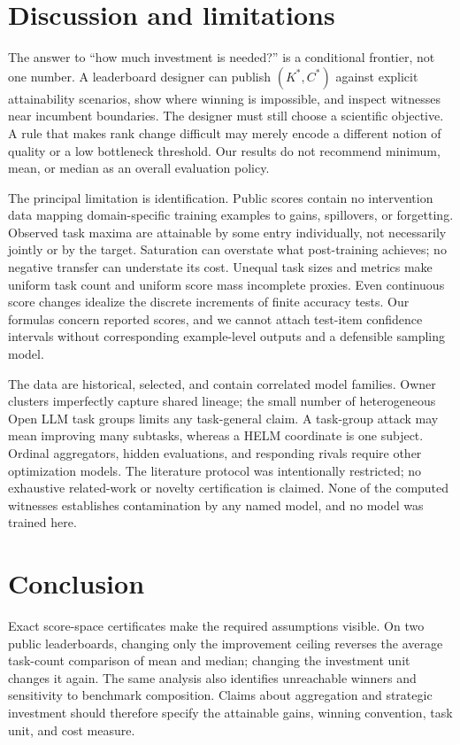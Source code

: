 \documentclass{article}
\begin{document}
\section{Discussion and limitations}
\label{sec:discussion}
The answer to ``how much investment is needed?'' is a conditional frontier, not
one number. A leaderboard designer can publish $(K^*,C^*)$ against explicit
attainability scenarios, show where winning is impossible, and inspect witnesses
near incumbent boundaries. The designer must still choose a scientific objective.
A rule that makes rank change difficult may merely encode a different notion of
quality or a low bottleneck threshold. Our results do not recommend minimum,
mean, or median as an overall evaluation policy.

The principal limitation is identification. Public scores contain no intervention
data mapping domain-specific training examples to gains, spillovers, or forgetting.
Observed task maxima are attainable by some entry individually, not necessarily
jointly or by the target. Saturation can overstate what post-training achieves;
no negative transfer can understate its cost. Unequal task sizes and metrics make
uniform task count and uniform score mass incomplete proxies. Even continuous
score changes idealize the discrete increments of finite accuracy tests. Our
formulas concern reported scores, and we cannot attach test-item confidence
intervals without corresponding example-level outputs and a defensible sampling model.

The data are historical, selected, and contain correlated model families. Owner
clusters imperfectly capture shared lineage; the small number of heterogeneous
Open LLM task groups limits any task-general claim. A task-group attack may mean
improving many subtasks, whereas a HELM coordinate is one subject. Ordinal
aggregators, hidden evaluations, and responding rivals require other optimization
models. The literature protocol was intentionally restricted; no exhaustive
related-work or novelty certification is claimed. None of the computed witnesses
establishes contamination by any named model, and no model was trained here.

\section{Conclusion}
Exact score-space certificates make the required assumptions visible. On two public
leaderboards, changing only the improvement ceiling reverses the average task-count
comparison of mean and median; changing the investment unit changes it again.
The same analysis also identifies unreachable winners and sensitivity to benchmark
composition. Claims about aggregation and strategic investment should therefore
specify the attainable gains, winning convention, task unit, and cost measure.
\label{endmain}
\end{document}
